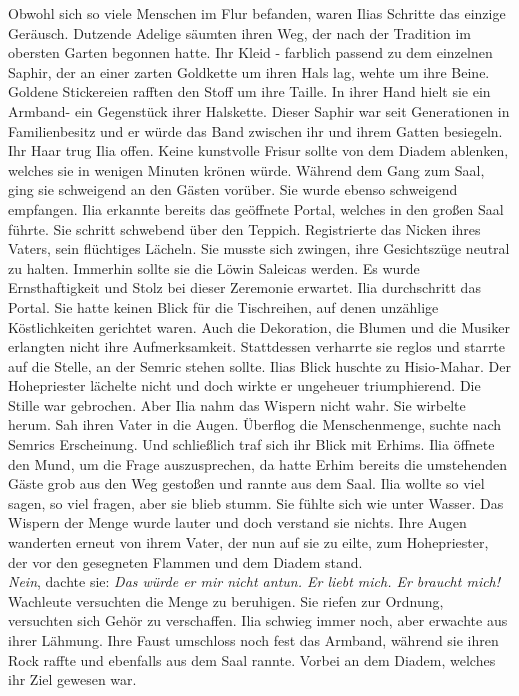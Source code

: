 Obwohl sich so viele Menschen im Flur befanden, waren Ilias Schritte das einzige Geräusch. Dutzende 
Adelige säumten ihren Weg, der nach der Tradition im obersten Garten begonnen hatte. Ihr Kleid - 
farblich passend zu dem einzelnen Saphir, der an einer zarten Goldkette um ihren Hals lag, wehte um 
ihre Beine. Goldene Stickereien rafften den Stoff um ihre Taille. In ihrer Hand hielt sie ein 
Armband- ein Gegenstück ihrer Halskette. Dieser Saphir war seit Generationen in Familienbesitz 
und er würde das Band zwischen ihr und ihrem Gatten besiegeln. Ihr Haar trug Ilia offen. Keine 
kunstvolle Frisur sollte von dem Diadem ablenken, welches sie in wenigen Minuten krönen würde. 
Während dem Gang zum Saal, ging sie schweigend an den Gästen vorüber. Sie wurde ebenso schweigend 
empfangen. Ilia erkannte bereits das geöffnete Portal, welches in den großen Saal führte. Sie 
schritt schwebend über den Teppich. Registrierte das Nicken ihres Vaters, sein flüchtiges Lächeln. 
Sie musste sich zwingen, ihre Gesichtszüge neutral zu halten. Immerhin sollte sie die Löwin 
Saleicas werden. Es wurde Ernsthaftigkeit und Stolz bei dieser Zeremonie erwartet. Ilia 
durchschritt das Portal. Sie hatte keinen Blick für die Tischreihen, auf denen unzählige 
Köstlichkeiten gerichtet waren. Auch die Dekoration, die Blumen und die Musiker erlangten nicht 
ihre Aufmerksamkeit. Stattdessen verharrte sie reglos und starrte auf die Stelle, an der Semric 
stehen sollte. Ilias Blick huschte zu Hisio-Mahar. Der Hohepriester lächelte nicht und doch wirkte 
er ungeheuer triumphierend. Die Stille war gebrochen. Aber Ilia nahm das Wispern nicht wahr. Sie 
wirbelte herum. Sah ihren Vater in die Augen. Überflog die Menschenmenge, suchte nach Semrics 
Erscheinung. Und schließlich traf sich ihr Blick mit Erhims. Ilia öffnete den Mund, um die Frage 
auszusprechen, da hatte Erhim bereits die umstehenden Gäste grob aus den Weg gestoßen und rannte 
aus dem Saal. Ilia wollte so viel sagen, so viel fragen, aber sie blieb stumm. Sie fühlte sich wie 
unter Wasser. Das Wispern der Menge wurde lauter und doch verstand sie nichts. Ihre Augen wanderten 
erneut von ihrem Vater, der nun auf sie zu eilte, zum Hohepriester, der vor den gesegneten Flammen 
und dem Diadem stand. \\
\textit{Nein}, dachte sie: \textit{Das würde er mir nicht antun. Er liebt mich. Er braucht mich!}\\
Wachleute versuchten die Menge zu beruhigen. Sie riefen zur Ordnung, versuchten sich Gehör zu 
verschaffen. Ilia schwieg immer noch, aber erwachte aus ihrer Lähmung. Ihre Faust umschloss 
noch fest das Armband, während sie ihren Rock raffte und ebenfalls aus dem Saal rannte. Vorbei an 
dem Diadem, welches ihr Ziel gewesen war.\\

